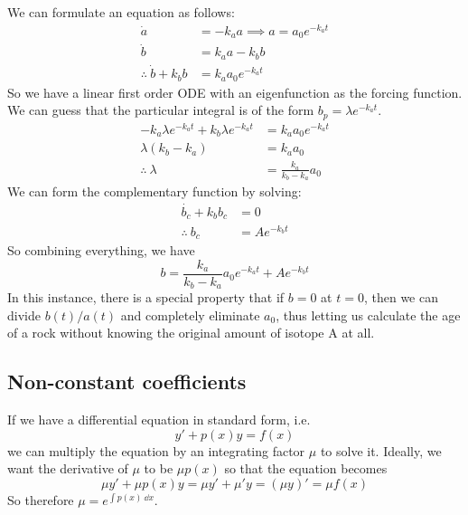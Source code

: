 We can formulate an equation as follows:
\begin{align*}
	\dot a                    & = -k_a a \implies a = a_0 e^{-k_a t} \\
	\dot b                    & = k_a a - k_b b                      \\
	\therefore\ \dot b + k_b b & = k_a a_0 e^{-k_a t}
\end{align*}
So we have a linear first order ODE with an eigenfunction as the forcing function.
We can guess that the particular integral is of the form \(b_p = \lambda e^{-k_a t}\).
\begin{align*}
	-k_a\lambda e^{-k_a t} + k_b \lambda e^{-k_a t} & = k_a a_0 e^{-k_a t}        \\
	\lambda(k_b-k_a)                                & = k_a a_0                   \\
	\therefore\ \lambda                              & = \frac{k_a}{k_b - k_a} a_0
\end{align*}
We can form the complementary function by solving:
\begin{align*}
	\dot{b_c} + k_b b_c & = 0           \\
	\therefore\ b_c      & = Ae^{-k_b t}
\end{align*}
So combining everything, we have
\[
	b = \frac{k_a}{k_b - k_a} a_0 e^{-k_a t} + Ae^{-k_b t}
\]
In this instance, there is a special property that if \(b=0\) at \(t=0\), then we can divide \(b(t)/a(t)\) and completely eliminate \(a_0\), thus letting us calculate the age of a rock without knowing the original amount of isotope A at all.

\subsection{Non-constant coefficients}
If we have a differential equation in standard form, i.e.
\[
	y' + p(x)y = f(x)
\]
we can multiply the equation by an integrating factor \(\mu\) to solve it.
Ideally, we want the derivative of \(\mu\) to be \(\mu p(x)\) so that the equation becomes
\[
	\mu y' + \mu p(x) y = \mu y' + \mu' y = (\mu y)' = \mu f(x)
\]
So therefore \(\mu = e^{\int p(x)\ \dd{x}}\).

